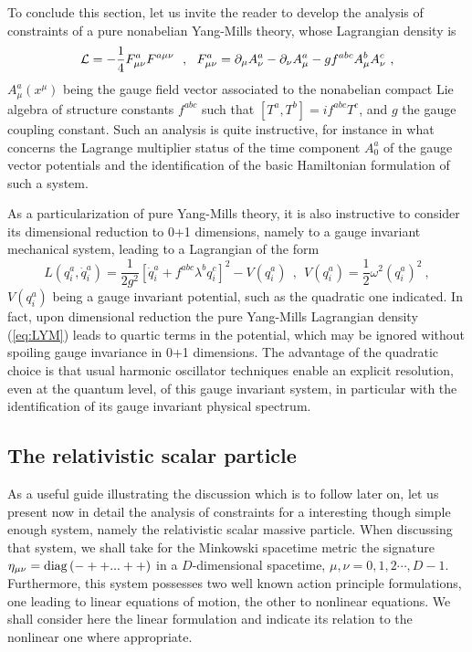 \documentclass[a4paper,11pt]{article}
\begin{document}
To conclude this section, let us invite the reader to develop the
analysis of constraints of a pure nonabelian Yang-Mills theory, whose
Lagrangian density is
\begin{equation}
{\cal L}=-\frac{1}{4}F^a_{\mu\nu}F^{a\mu\nu}\ \ ,\ \ 
F^a_{\mu\nu}=\partial_\mu A^a_\nu-\partial_\nu A^a_\mu-
gf^{abc}A^b_\mu A^c_\nu\ ,
\label{eq:LYM}
\end{equation}
$A^a_\mu(x^\mu)$ being the gauge field vector associated to the nonabelian
compact Lie algebra of structure constants $f^{abc}$ such that
$[T^a,T^b]=if^{abc}T^c$, and $g$ the gauge coupling constant. Such an
analysis is quite instructive, for instance in what concerns the
Lagrange multiplier status of the time component $A^a_0$ of the gauge vector
potentials and the identification of the basic Hamiltonian formulation of
such a system.

As a particularization of pure Yang-Mills theory, it is also instructive
to consider its dimensional reduction to 0+1 dimensions,\cite{JG3} namely to
a gauge invariant mechanical system, leading to a Lagrangian of the
form
\begin{equation}
L(q^a_i,\dot{q}^a_i)=\frac{1}{2g^2}\left[\dot{q}^a_i+
f^{abc}\lambda^bq^c_i\right]^2-V(q^a_i)\ \ ,\ \ 
V(q^a_i)=\frac{1}{2}\omega^2\left(q^a_i\right)^2\ ,
\end{equation}
$V(q^a_i)$ being a gauge invariant potential, such as the quadratic one
indicated. In fact, upon dimensional reduction the pure Yang-Mills
Lagrangian density (\ref{eq:LYM}) leads to quartic terms
in the potential, which may be ignored without spoiling gauge invariance
in 0+1 dimensions. The advantage of the quadratic choice is that usual
harmonic oscillator techniques enable an explicit resolution, even at the
quantum level, of this gauge invariant system, in particular with the
identification of its gauge invariant physical spectrum.

\subsection{The relativistic scalar particle}
\label{Subsect5.2}

As a useful guide illustrating the discussion which is to follow
later on, let us present now in detail the analysis of constraints
for a interesting though simple enough system, namely the relativistic
scalar massive particle.\cite{JG1} When discussing that system, we shall 
take for the Minkowski spacetime metric the signature 
$\eta_{\mu\nu}={\rm diag}\,(-++...++)$
in a $D$-dimensional spacetime, $\mu,\nu=0,1,2\cdots,D-1$. Furthermore,
this system possesses two well known action principle formulations,
one leading to linear equations of motion, the other to nonlinear equations.
We shall consider here the linear formulation and indicate its relation
to the nonlinear one where appropriate.
\end{document}
